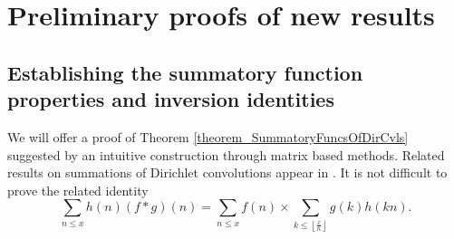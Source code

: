 \documentclass[11pt,reqno,a4letter]{article}
\numberwithin{figure}{section}
\numberwithin{table}{section}
\newcommand{\cf}{\textit{cf.\ }}
\newcommand{\Floor}[2]{\ensuremath{\left\lfloor \frac{#1}{#2} \right\rfloor}}
\theoremstyle{plain}
\numberwithin{theorem}{section}
\theoremstyle{definition}
\begin{document}
\newpage 
\section{Preliminary proofs of new results} 
\label{Section_PrelimProofs_Config} 

\subsection{Establishing the summatory function properties and inversion identities} 

We will offer a proof of Theorem \ref{theorem_SummatoryFuncsOfDirCvls} 
suggested by an intuitive construction through matrix based methods. 
Related results on summations of Dirichlet convolutions appear in 
\cite[\S 2.14; \S 3.10; \S 3.12; \cf \S 4.9, p.\ 95]{APOSTOLANUMT}. 
It is not difficult to prove the related identity 
\[
\sum_{n \leq x} h(n) (f \ast g)(n) = 
     \sum_{n \leq x} f(n) \times \sum_{k \leq \Floor{x}{n}} g(k) h(kn). 
\]
\end{document}
